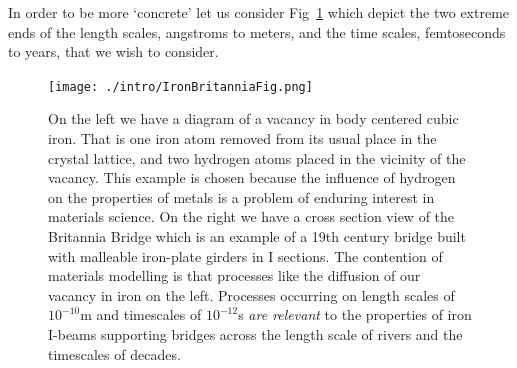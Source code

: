 In order to be more `concrete' let us consider Fig~\ref{fig:britannia} which depict the two
extreme ends of the length scales, angstroms to meters, and the time scales, femtoseconds to years,
that we wish to consider.
%
\begin{figure}
\begin{center}
\texttt{[image: ./intro/IronBritanniaFig.png]}
\end{center}
\caption{On the left we have a diagram of a vacancy in body centered cubic iron. That is one iron 
         atom removed from its usual place in the crystal lattice, and two hydrogen 
         atoms placed in the vicinity of the vacancy. This example is chosen because the influence of
         hydrogen on the properties of metals is a problem of enduring interest in materials science.
         On the right we have a cross section view of the Britannia Bridge which is an example of a 19th 
         century bridge built with malleable iron-plate girders in I sections. The contention of materials
         modelling is that processes like the diffusion of our vacancy in iron on the left. Processes 
         occurring on length scales of $10^{-10}$m and timescales of $10^{-12}$s \textit{are
         relevant} to the properties of iron I-beams supporting bridges across the length scale of
         rivers and the timescales of decades. \label{fig:britannia}}
\end{figure}
%

